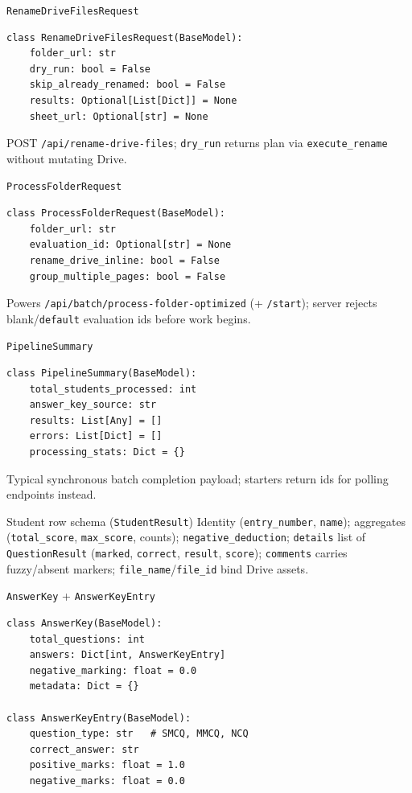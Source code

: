 \documentclass[aspectratio=169]{beamer}
\begin{document}
\begin{frame}[fragile]{\texttt{RenameDriveFilesRequest}}
\begin{lstlisting}[style=pys]
class RenameDriveFilesRequest(BaseModel):
    folder_url: str
    dry_run: bool = False
    skip_already_renamed: bool = False
    results: Optional[List[Dict]] = None
    sheet_url: Optional[str] = None
\end{lstlisting}
\vfill
\tiny POST \texttt{/api/rename-drive-files}; \texttt{dry\_run} returns plan via \texttt{execute\_rename} without mutating Drive.
\end{frame}

\begin{frame}[fragile]{\texttt{ProcessFolderRequest}}
\begin{lstlisting}[style=pys]
class ProcessFolderRequest(BaseModel):
    folder_url: str
    evaluation_id: Optional[str] = None
    rename_drive_inline: bool = False
    group_multiple_pages: bool = False
\end{lstlisting}
\vfill
\tiny Powers \texttt{/api/batch/process-folder-optimized} (+ \texttt{/start}); server rejects blank/\texttt{default} evaluation ids before work begins.
\end{frame}

\begin{frame}[fragile]{\texttt{PipelineSummary}}
\begin{lstlisting}[style=pys]
class PipelineSummary(BaseModel):
    total_students_processed: int
    answer_key_source: str
    results: List[Any] = []
    errors: List[Dict] = []
    processing_stats: Dict = {}
\end{lstlisting}
\vfill
\tiny Typical synchronous batch completion payload; starters return ids for polling endpoints instead.
\end{frame}

\begin{frame}{Student row schema (\texttt{StudentResult})}
  \tiny
  Identity (\texttt{entry\_number}, \texttt{name}); aggregates (\texttt{total\_score}, \texttt{max\_score}, counts); \texttt{negative\_deduction}; \texttt{details} list of \texttt{QuestionResult} (\texttt{marked}, \texttt{correct}, \texttt{result}, \texttt{score}); \texttt{comments} carries fuzzy/absent markers; \texttt{file\_name}/\texttt{file\_id} bind Drive assets.
\end{frame}

\begin{frame}[fragile]{\texttt{AnswerKey} + \texttt{AnswerKeyEntry}}
\begin{lstlisting}[style=pys]
class AnswerKey(BaseModel):
    total_questions: int
    answers: Dict[int, AnswerKeyEntry]
    negative_marking: float = 0.0
    metadata: Dict = {}

class AnswerKeyEntry(BaseModel):
    question_type: str   # SMCQ, MMCQ, NCQ
    correct_answer: str
    positive_marks: float = 1.0
    negative_marks: float = 0.0
\end{lstlisting}
\end{frame}
\end{document}

